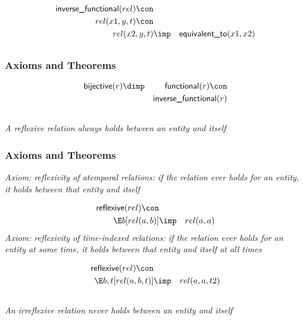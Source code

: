 \begin{eqnarray*}
 \pr{inverse\_functional}(rel) \con \\
rel(x1, y, t) \con \\
rel(x2, y, t) &\imp & \pr{equivalent\_to}(x1, x2) 
\end{eqnarray*}

\subsection{ }
\subsubsection{Axioms and Theorems}


\begin{eqnarray*}
 \pr{bijective}(r) &\dimp & \pr{functional}(r) \con \\
&& \pr{inverse\_functional}(r) 
\end{eqnarray*}

\subsection{ }
\emph{A reflexive relation always holds between an entity and itself}

\subsubsection{Axioms and Theorems}


\emph{Axiom: reflexivity of atemporal relations: if the relation ever holds for an entity, it holds between that entity and itself}

\begin{eqnarray*}
 \pr{reflexive}(rel) \con \\
 \E b[rel(a, b) ]&\imp &rel(a, a) 
\end{eqnarray*}
\emph{Axiom: reflexivity of time-indexed relations: if the relation ever holds for an entity at some time, it holds between that entity and itself at all times}

\begin{eqnarray*}
 \pr{reflexive}(rel) \con \\
 \E b, t[rel(a, b, t) ]&\imp &rel(a, a, t2) 
\end{eqnarray*}

\subsection{ }
\emph{An irreflexive relation never holds between an entity and itself}

